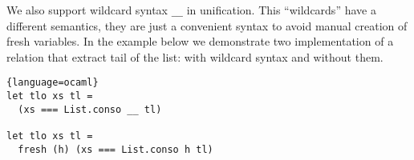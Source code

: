 We also support wildcard syntax \lstinline|__| in unification. This ``wildcards'' have a different semantics, they are just a convenient syntax to avoid manual creation of fresh variables. In the example below we demonstrate two implementation of a relation that extract tail of the list: with wildcard syntax and without them.

\begin{minipage}{\linewidth}
\begin{lstlisting}{language=ocaml}
let tlo xs tl =
  (xs === List.conso __ tl)

let tlo xs tl =
  fresh (h) (xs === List.conso h tl)
\end{lstlisting}
\end{minipage}
